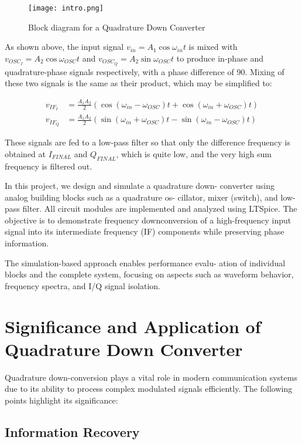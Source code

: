 \documentclass[conference]{IEEEtran}
\begin{document}
\begin{figure}[H]
\centering
\texttt{[image: intro.png]}
\caption{Block diagram for a Quadrature Down Converter}
\end{figure}

As shown above, the input signal $v_{in} = A_1 \cos \omega_{in} t$ is 
mixed with $v_{OSC_I} = A_2 \cos \omega_{OSC} t$ and 
$v_{OSC_Q} = A_2 \sin \omega_{OSC} t$ 
to produce in-phase and quadrature-phase signals respectively, 
with a phase difference of 90\degree. Mixing of these two signals 
is the same as their product, which may be simplified to:

\begin{align*}
v_{IF_I} &= \frac{A_1 A_2}{2} \left( \cos(\omega_{in} - \omega_{OSC})t + \cos(\omega_{in} + \omega_{OSC})t \right) \\
v_{IF_Q} &= \frac{A_1 A_2}{2} \left( \sin(\omega_{in} + \omega_{OSC})t - \sin(\omega_{in} - \omega_{OSC})t \right)
\end{align*}

These signals are fed to a low-pass filter so that only the difference frequency is obtained at $I_{FINAL}$ and $Q_{FINAL}$, which is quite low, and the very high sum frequency is filtered out.


In this project, we design and simulate a quadrature down-
converter using analog building blocks such as a quadrature os-
cillator, mixer (switch), and low-pass filter. All circuit modules
are implemented and analyzed using LTSpice. The objective is
to demonstrate frequency downconversion of a high-frequency
input signal into its intermediate frequency (IF) components
while preserving phase information.

The simulation-based approach enables performance evalu-
ation of individual blocks and the complete system, focusing
on aspects such as waveform behavior, frequency spectra, and
I/Q signal isolation.

\section{Significance and Application of Quadrature Down Converter}
Quadrature down-conversion plays a vital role in modern communication systems due to its ability to process complex modulated signals efficiently. The following points highlight its significance:

\subsection{Information Recovery}
\end{document}
